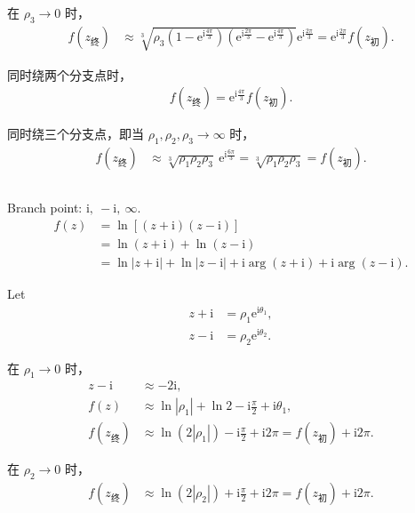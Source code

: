 \documentclass[12pt]{article}
\newcommand{\mrm}[1]{\mathrm{#1}}
\begin{document}
在 \(\rho_3\to0\) 时，
\begin{align*}
f(z_{\text{终}}) &\approx \sqrt[3]{\rho_3\left(1-\mathrm{e}^{\mathrm{i}\frac{4\pi}{3}}\right)\left(\mathrm{e}^{\mathrm{i}\frac{2\pi}{3}}-\mathrm{e}^{\mathrm{i}\frac{4\pi}{3}}\right)} \mathrm{e}^{\mathrm{i}\frac{2\pi}{3}} = \mathrm{e}^{\mathrm{i}\frac{2\pi}{3}} f(z_{\text{初}}).
\end{align*}

同时绕两个分支点时，
\begin{align*}
f(z_{\text{终}}) = \mathrm{e}^{\mathrm{i}\frac{4\pi}{3}} f(z_{\text{初}}).
\end{align*}

同时绕三个分支点，即当 \(\rho_1,\rho_2,\rho_3\to\infty\) 时，
\begin{align*}
f(z_{\text{终}}) &\approx \sqrt[3]{\rho_1\rho_2\rho_3}\ \mathrm{e}^{\mathrm{i}\frac{6\pi}{3}} = \sqrt[3]{\rho_1\rho_2\rho_3} = f(z_{\text{初}}).
\end{align*}
\subsection{}
Branch point: \(\mathrm{i},\ -\mathrm{i},\ \infty\).
\begin{align*}
f(z) &= \ln\left[(z+\mrm i)(z-\mrm i)\right] \\&= \ln(z+\mrm i) + \ln(z-\mrm i) \\
&= \ln|z+\mrm i| + \ln|z-\mrm i| + \mathrm{i}\arg(z+\mrm i) + \mathrm{i}\arg(z-\mrm i).
\end{align*}

Let
\begin{align*}
z+\mrm i &= \rho_1 \mathrm{e}^{\mathrm{i}\theta_1}, \\
z-\mrm i &= \rho_2 \mathrm{e}^{\mathrm{i}\theta_2}.
\end{align*}

在 \(\rho_1\to0\) 时，
\begin{align*}
z-\mrm i &\approx -2\mrm i, \\
f(z) &\approx \ln|\rho_1| + \ln 2 -\mrm i\frac{\pi}{2}+ \mathrm{i}\theta_1, \\
f(z_{\text{终}}) &\approx \ln\left(2|\rho_1|\right) -\mrm i\frac{\pi}{2}+ \mathrm{i}2\pi = f(z_{\text{初}}) + \mathrm{i}2\pi.
\end{align*}

在 \(\rho_2\to0\) 时，
\begin{align*}
f(z_{\text{终}}) &\approx \ln\left(2|\rho_2|\right) +\mrm i\frac{\pi}{2}+ \mathrm{i}2\pi = f(z_{\text{初}}) + \mathrm{i}2\pi.
\end{align*}
\end{document}
